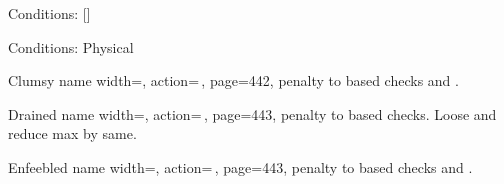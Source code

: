 \renewcommand{\PageBottomReferences}{%
    \hfill
}%
\setlength{\parindent}{0mm}%
\begin{PageFront}
    \begin{Tables}{\frontTableHeight}
        \begin{Table}{Conditions: }[{\OffGuard}]
        \end{Table}
        \TableSpace
        \begin{Table}{Conditions: Physical}
            \begin{entry}{Clumsy}{%
                name width=\conditionLength,%
                action=\,\X,
                page=442,
            }
                \Numb{-\X} \Status penalty to \Dexterity based checks and \DCs.\hfill {}
            \end{entry}
            \begin{entry}{Drained}{%
                name width=\conditionLength,%
                action=\,\X,
                page=443,
            }
                \Numb{-\X} \Status penalty to \Constitution based checks. Loose \Numb{\X\Times \Level} \HPs and
                reduce max \HPs by same. \hfill {} 
            \end{entry}
            \begin{entry}{Enfeebled}{%
                name width=\conditionLength,%
                action=\,\X,
                page=443,
            }
                \Numb{-\X} \Status penalty to \Strength based checks and \DCs. \hfill \Ex{\Strength
}
\end{entry}
\end{Table}
\end{Tables}
\end{PageFront}
